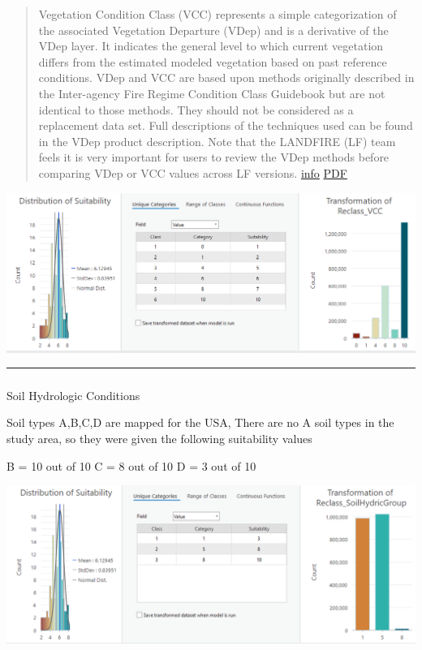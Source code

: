 \documentclass[
]{agujournal2019}
\makeatletter
\let\oldsubparagraph\subparagraph
\renewcommand{\subparagraph}{
    \@ifstar
      \xxxSubParagraphStar
      \xxxSubParagraphNoStar
  }
\newcommand{\xxxSubParagraphStar}[1]{\oldsubparagraph*{#1}\mbox{}}
\newcommand{\xxxSubParagraphNoStar}[1]{\oldsubparagraph{#1}\mbox{}}
\makeatother
\begin{document}
\begin{quote}
Vegetation Condition Class (VCC) represents a simple categorization of
the associated Vegetation Departure (VDep) and is a derivative of the
VDep layer. It indicates the general level to which current vegetation
differs from the estimated modeled vegetation based on past reference
conditions. VDep and VCC are based upon methods originally described in
the Inter-agency Fire Regime Condition Class Guidebook but are not
identical to those methods. They should not be considered as a
replacement data set. Full descriptions of the techniques used can be
found in the VDep product description. Note that the LANDFIRE (LF) team
feels it is very important for users to review the VDep methods before
comparing VDep or VCC values across LF versions.
\href{https://www.landfire.gov/vegetation/vcc}{info}
\href{https://www.landfire.gov/sites/default/files/DataDictionary/LF2022/LF22_VCCADD_230.pdf}{PDF}
\end{quote}

\includegraphics{images/VCC_suitability.PNG}

\begin{center}\rule{0.5\linewidth}{0.5pt}\end{center}

\subparagraph{Soil Hydrologic
Conditions}\label{soil-hydrologic-conditions}

Soil types A,B,C,D are mapped for the USA, There are no A soil types in
the study area, so they were given the following suitability values

B = 10 out of 10 C = 8 out of 10 D = 3 out of 10

\includegraphics{images/SoilHydrologicGroup_suitability.PNG}
\end{document}

